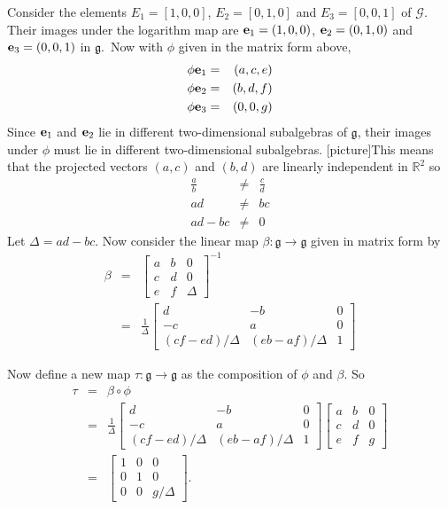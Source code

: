 \documentclass[honours]{UNSWthesis}
\newcommand{\R}{\mathbb{R}}
\newcommand{\G}{\mathcal{G}}
\newcommand{\g}{\mathfrak{g}}
\newcommand{\1}{\mathbf{e}_{1}}
\newcommand{\2}{\mathbf{e}_{3}}
\newcommand{\3}{\mathbf{e}_{3}}
\begin{document}
Consider the elements $E_{1}=[1,0,0]$, $E_{2}=[0,1,0]$ and $E_{3}=[0,0,1]$ of $\G$. Their images under the logarithm map are ${\bf e}_{1}=(1,0,0)$, ${\bf e}_{2}=(0,1,0)$ and ${\bf e}_{3}=(0,0,1)$ in $\g$.\
Now with $\phi$ given in the matrix form above,
\begin{eqnarray*}
\phi {\bf e}_{1} &=& (a,c,e) \\
\phi {\bf e}_{2} &=& (b,d,f) \\
\phi {\bf e}_{3} &=& (0,0,g)
\end{eqnarray*}
Since ${\bf e}_{1}$ and ${\bf e}_{2}$ lie in different two-dimensional subalgebras of $\g$, their images under $\phi$ must lie in different two-dimensional subalgebras. [picture]This means that the projected vectors $(a,c)$ and $(b,d)$ are linearly independent in $\R^{2}$ so 
\begin{eqnarray*}
\frac{a}{b} &\neq & \frac{c}{d} \\
ad &\neq & bc\\
ad-bc &\neq & 0 
\end{eqnarray*} Let $\Delta = ad-bc$.
Now consider the linear map $\beta:\g \longrightarrow \g$ given in matrix form by 
\begin{eqnarray*}
\beta &=& \begin{bmatrix}
a & b & 0 \\
c & d & 0 \\
e & f & \Delta
\end{bmatrix}^{-1} \\
&=& \frac{1}{\Delta}\begin{bmatrix}
d & -b & 0 \\
-c & a & 0 \\
(cf-ed)/\Delta & (eb-af)/\Delta & 1
\end{bmatrix}
\end{eqnarray*}

Now define a new map $\tau: \g \longrightarrow \g$ as the composition of $\phi$ and $\beta$. So 
\begin{eqnarray*}
\tau &=& \beta \circ  \phi \\
&=& \frac{1}{\Delta}\begin{bmatrix}
d & -b & 0 \\
-c & a & 0 \\
(cf-ed)/\Delta & (eb-af)/\Delta & 1
\end{bmatrix}
\begin{bmatrix}
a & b & 0 \\
c & d & 0 \\
e & f & g
\end{bmatrix} \\
&=& 
\begin{bmatrix}
1 & 0 & 0 \\
0 & 1 & 0 \\
0 & 0 & g/\Delta
\end{bmatrix}.
\end{eqnarray*}
\end{document}
